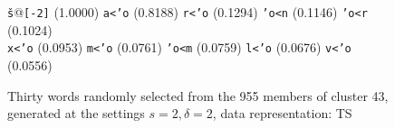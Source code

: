\begin{figure}[t]
\begin{mdframed}
\begin{mdframed}
\begin{small}
\begin{tabbing}
\texttt{\v{s}}@\texttt{[-2]} \> (1.0000) \> \texttt{a<\a'{o}} \> (0.8188) \> \texttt{r<\a'{o}} \> (0.1294) \> \texttt{\a'{o}<n} \> (0.1146) \> \texttt{\a'{o}<r} \> (0.1024) \\
\texttt{x<\a'{o}} \> (0.0953) \> \texttt{m<\a'{o}} \> (0.0761) \> \texttt{\a'{o}<m} \> (0.0759) \> \texttt{l<\a'{o}} \> (0.0676) \> \texttt{v<\a'{o}} \> (0.0556)
\end{tabbing}
\end{small}
\end{mdframed}
\caption{Thirty words randomly selected from the 955 members of cluster 43, generated at the settings $s=2,\delta =2$, data representation: TS}
\label{fig:cluster-43-2-2-TS}
\end{mdframed}
\end{figure}
%
%

